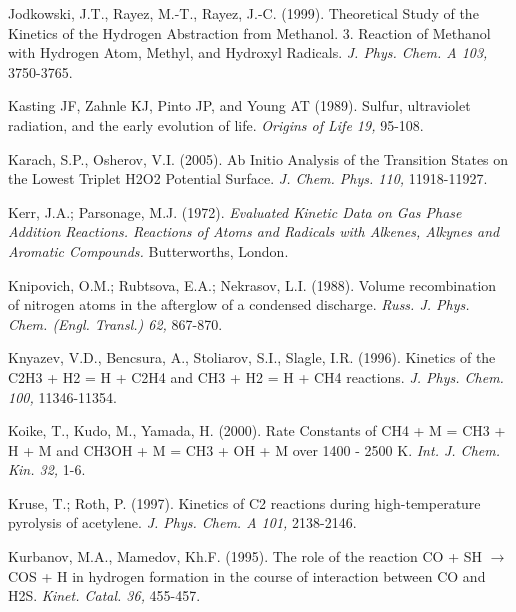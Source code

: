\documentclass[12pt,landscape]{article}
\newcounter{reaction}
\begin{document}
Jodkowski, J.T., Rayez, M.-T., Rayez, J.-C. (1999). Theoretical Study of the Kinetics of the Hydrogen Abstraction from Methanol. 3. Reaction of Methanol with Hydrogen Atom, Methyl, and Hydroxyl Radicals. {\em J. Phys. Chem. A 103,} 3750-3765. 
 
Kasting JF, Zahnle KJ, Pinto JP, and Young AT (1989). Sulfur, ultraviolet radiation, and the early evolution of life. {\em Origins of Life 19,} 95-108.

Karach, S.P., Osherov, V.I.  (2005). Ab Initio Analysis of the Transition States on the Lowest Triplet H2O2 Potential Surface. {\em J. Chem. Phys. 110,} 11918-11927.


Kerr, J.A.; Parsonage, M.J. (1972). {\em Evaluated Kinetic Data on Gas Phase Addition Reactions. Reactions of Atoms and Radicals with Alkenes, Alkynes and Aromatic Compounds.} Butterworths, London.

Knipovich, O.M.; Rubtsova, E.A.; Nekrasov, L.I. (1988).   Volume recombination of nitrogen atoms in the afterglow of a condensed discharge. {\em Russ. J. Phys. Chem. (Engl. Transl.) 62,} 867-870.

Knyazev, V.D., Bencsura, A., Stoliarov, S.I., Slagle, I.R. (1996).  Kinetics of the C2H3 + H2 = H + C2H4 and CH3 + H2 = H + CH4 reactions. {\em J. Phys. Chem. 100,} 11346-11354.

Koike, T., Kudo, M., Yamada, H. (2000). Rate Constants of CH4 + M = CH3 + H + M and CH3OH + M = CH3 + OH + M over 1400 - 2500 K.  {\em Int. J. Chem. Kin. 32,} 1-6.


Kruse, T.; Roth, P. (1997). Kinetics of C2 reactions during high-temperature pyrolysis of acetylene. {\em J. Phys. Chem. A 101,}  2138-2146.

Kurbanov, M.A., Mamedov, Kh.F.  (1995). The role of the reaction CO + SH $\rightarrow$ COS + H in hydrogen formation in the course of interaction between CO and H2S. {\em Kinet. Catal.  36,} 455-457.
\end{document}
